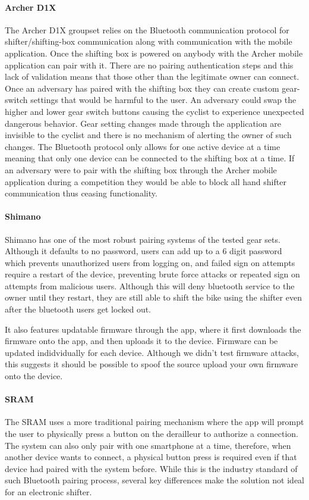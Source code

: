 \documentclass[letterpaper,twocolumn,10pt]{article}
\begin{document}
\paragraph{Archer D1X}
The Archer D1X groupset relies on the Bluetooth communication protocol for shifter/shifting-box communication along with communication with the mobile application. Once the shifting box is powered on anybody with the Archer mobile application can pair with it. There are no pairing authentication steps and this lack of validation means that those other than the legitimate owner can connect. Once an adversary has paired with the shifting box they can create custom gear-switch settings that would be harmful to the user. An adversary could swap the higher and lower gear switch buttons causing the cyclist to experience unexpected dangerous behavior. Gear setting changes made through the application are invisible to the cyclist and there is no mechanism of alerting the owner of such changes. The Bluetooth protocol only allows for one active device at a time meaning that only one device can be connected to the shifting box at a time. If an adversary were to pair with the shifting box through the Archer mobile application during a competition they would be able to block all hand shifter communication thus ceasing functionality.

\paragraph{Shimano}
Shimano has one of the most robust pairing systems of the tested gear sets. Although it defaults to no password, users can add up to a 6 digit password which prevents unauthorized users from logging on, and failed sign on attempts require a restart of the device, preventing brute force attacks or repeated sign on attempts from malicious users. Although this will deny bluetooth service to the owner until they restart, they are still able to shift the bike using the shifter even after the bluetooth users get locked out.

It also features updatable firmware through the app, where it first downloads the firmware onto the app, and then uploads it to the device. Firmware can be updated indidvidually for each device. Although we didn't test firmware attacks, this suggests it should be possible to spoof the source upload your own firmware onto the device.

\paragraph{SRAM}
The SRAM uses a more traditional pairing mechanism where the app will prompt the user to physically press a button on the derailleur to authorize a connection. The system can also only pair with one smartphone at a time, therefore, when another device wants to connect, a physical button press is required even if that device had paired with the system before. While this is the industry standard of such Bluetooth pairing process, several key differences make the solution not ideal for an electronic shifter.
\end{document}
